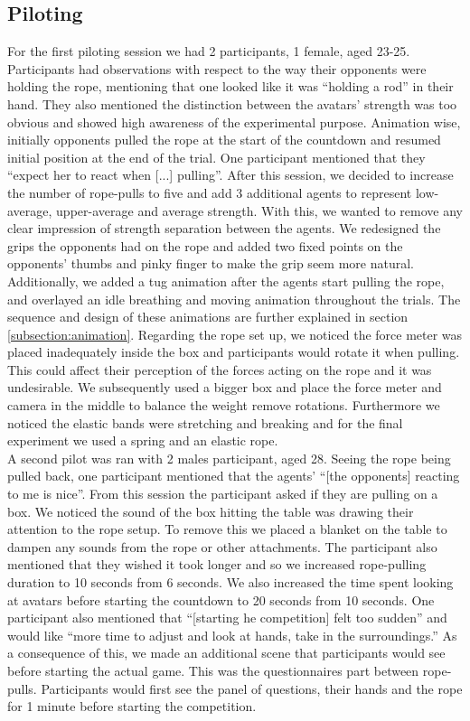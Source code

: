 \subsection{Piloting}
\label{subsection:Piloting}
 For the first piloting session we had 2 participants, 1 female, aged 23-25. Participants had observations with respect to the way their opponents were holding the rope, mentioning that one looked like it was ``holding a rod'' in their hand. They also mentioned the distinction between the avatars' strength was too obvious and showed high awareness of the experimental purpose. 
    Animation wise, initially opponents pulled the rope at the start of the countdown and resumed initial position at the end of the trial. One participant mentioned that they ``expect her to react when [...] pulling''.
    After this session, we decided to increase the number of rope-pulls to five and add 3 additional agents to represent low-average, upper-average and average strength. With this, we wanted to remove any clear impression of strength separation between the agents. We redesigned the grips the opponents had on the rope and added two fixed points on the opponents' thumbs and pinky finger to make the grip seem more natural. 
\\
Additionally, we added a tug animation after the agents start pulling the rope, and overlayed an idle breathing and moving animation throughout the trials. The sequence and design of these animations are further explained in section \ref{subsection:animation}.
     Regarding the rope set up, we noticed the force meter was placed inadequately inside the box and participants would rotate it when pulling. This could affect their perception of the forces acting on the rope and it was undesirable. We subsequently used a bigger box and place the force meter and camera in the middle to balance the weight remove rotations. Furthermore we noticed the elastic bands were stretching and breaking and for the final experiment we used a spring and an elastic rope.    
 \\
  A second pilot was ran with 2 males participant, aged 28. Seeing the rope being pulled back, one participant mentioned that the agents' ``[the opponents] reacting to me is nice''. From this session the participant asked if they are pulling on a box. We noticed the sound of the box hitting the table was drawing their attention to the rope setup. To remove this we placed a blanket on the table to dampen any sounds from the rope or other attachments. The participant also mentioned that they wished it took longer and so we increased rope-pulling duration to 10 seconds from 6 seconds. We also increased the time spent looking at avatars before starting the countdown to 20 seconds from 10 seconds. One participant also mentioned that ``[starting he competition] felt too sudden'' and would like ``more time to adjust and look at hands, take in the surroundings.'' As a consequence of this, we made an additional scene that participants would see before starting the actual game. This was the questionnaires part between rope-pulls. Participants would first see the panel of questions, their hands and the rope for 1 minute before starting the competition.
